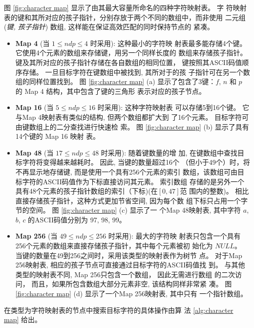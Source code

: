 图 \ref{fig:character map} 显示了由其最大容量所命名的四种字符映射表。 字
符映射表的键和其所对应的孩子指针，分别存放于两个不同的数组中，而非使用
二元组 (\emph{键, 孩子指针}) 数组, 这样能在保证高效匹配的同时保持节点的
紧凑。

\begin{itemize}
\item \textbf{Map 4} (当 $1 \leq ndp \leq 4$ 时采用): 这种最小的字符映
  射表最多能存储4个键。 它使用4个元素的数组来存储键，用另一个同样长度的
  数组来存储孩子指针。 键及其所对应的孩子指针存储在各自数组的相同位置，
  键按照其ASCII码值顺序存储。 一旦目标字符在键数组中被找到, 其所对于的孩
  子指针可在另一个数组的同样位置找到。  图 \ref{fig:character map} (a)
  显示了包含了3键：$f$, $n$ 和 $p$ 的 Map 4 结构，其中包含了键的三角形
  表示对应的孩子节点。

\item \textbf{Map 16} (当 $5 \leq ndp \leq 16$ 时采用): 这种字符映射表
  可以存储5到16个键。 它与Map 4映射表有类似的结构, 但两个数组都扩大到
  了16个元素。 目标字符可由键数组上的二分查找进行快速检
  索。 图 \ref{fig:character map} (b) 显示了具有14个键的 Map 16 映射
  表。


\item \textbf{Map 48} (当 $17 \leq ndp \leq 48$ 时采用): 随着键数量的增
  加, 在键数组中查找目标字符将变得越来越耗时。 因此, 当键的数量超过16个
  （但小于49个）时，将不再显示地存储键, 而是使用一个具有256个元素的索引
  数组，该数组可由目标字符的ASCII码值作为下标直接访问其元素。 索引数组
  存储的是另外一个具有48个元素的孩子指针数组的索引（下标)(在$[0,47]$范
  围内的整数)。 相比直接存储孩子指针，这种方式更加节省空间, 因为每个数
  组下标只占用一个字节的空间。 图 \ref{fig:character map} (c) 显示了一
  个Map 48映射表, 其中字符 $a$, $b$, $c$ 的ASCII码值分别为 97, 98, 99。

\item \textbf{Map 256} (当 $49 \leq ndp \leq 256$ 时采用): 最大的字符映
  射表只包含一个具有256个元素的数组来直接存储孩子指针，其中每个元素被初
  始化为 $NULL$。 当键的数量在49到256之间时，采用该类型的映射表作为树节
  点。 对于Map 256映射表, 相应的孩子节点可直接通过目标字符的ASCII码值找
  到。 与其他类型的映射表不同, Map 256只包含一个数组， 因此无需进行数组
  的二次访问， 而且，如果所包含数组大部分元素非空, 该结构同样非常紧
  凑。 图 \ref{fig:character map} (d) 显示了一个Map 256映射表, 其中只有
  一个指针数组。
\end{itemize}

在类型为字符映射表的节点中搜索目标字符的具体操作由算
法 \ref{alg:character map} 给出。

